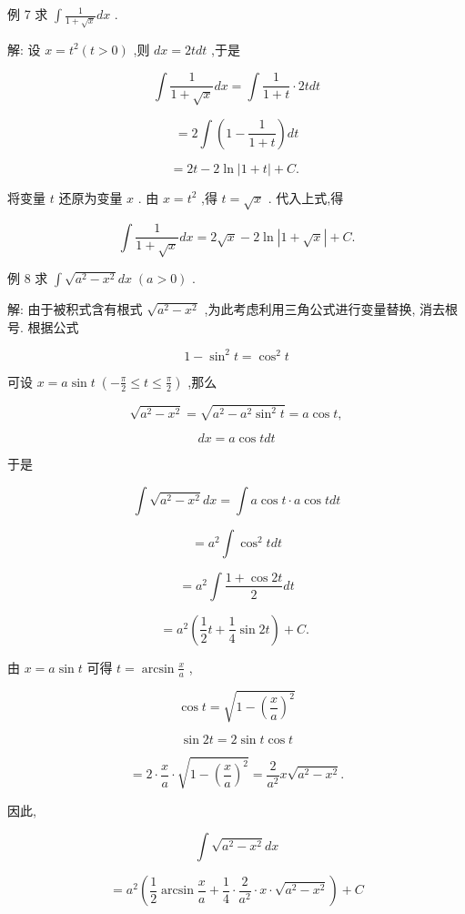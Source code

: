 \documentclass[lang=cn,newtx,10pt,scheme=chinese]{elegantbook}
\begin{document}
例 7 求 \(\int \frac{1}{1 + \sqrt{x}}{dx}\) .

解: 设 \(x = {t}^{2}\left( {t > 0}\right)\) ,则 \({dx} = {2tdt}\) ,于是

\[
\int \frac{1}{1 + \sqrt{x}}{dx} = \int \frac{1}{1 + t} \cdot {2tdt}
\]

\[
= 2\int \left( {1 - \frac{1}{1 + t}}\right) {dt}
\]

\[
= {2t} - 2\ln \left| {1 + t}\right| + C\text{. }
\]

将变量 \(t\) 还原为变量 \(x\) . 由 \(x = {t}^{2}\) ,得 \(t = \sqrt{x}\) . 代入上式,得

\[
\int \frac{1}{1 + \sqrt{x}}{dx} = 2\sqrt{x} - 2\ln \left| {1 + \sqrt{x}}\right| + C.
\]

例 8 求 \(\int \sqrt{{a}^{2} - {x}^{2}}{dx}\;\left( {a > 0}\right)\) .

解: 由于被积式含有根式 \(\sqrt{{a}^{2} - {x}^{2}}\) ,为此考虑利用三角公式进行变量替换, 消去根号. 根据公式

\[
1 - {\sin }^{2}t = {\cos }^{2}t
\]

可设 \(x = a\sin t\;\left( {-\frac{\pi }{2} \leq t \leq \frac{\pi }{2}}\right)\) ,那么

\[
\sqrt{{a}^{2} - {x}^{2}} = \sqrt{{a}^{2} - {a}^{2}{\sin }^{2}t} = a\cos t,
\]

\[
{dx} = a\cos {tdt}
\]

于是

\[
\int \sqrt{{a}^{2} - {x}^{2}}{dx} = \int a\cos t \cdot a\cos {tdt}
\]

\[
= {a}^{2}\int {\cos }^{2}{tdt}
\]

\[
= {a}^{2}\int \frac{1 + \cos {2t}}{2}{dt}
\]

\[
= {a}^{2}\left( {\frac{1}{2}t + \frac{1}{4}\sin {2t}}\right) + C\text{. }
\]

由 \(x = a\sin t\) 可得 \(t = \arcsin \frac{x}{a}\) ,

\[
\cos t = \sqrt{1 - {\left( \frac{x}{a}\right) }^{2}}
\]

\[
\sin {2t} = 2\sin t\cos t
\]

\[
= 2 \cdot \frac{x}{a} \cdot \sqrt{1 - {\left( \frac{x}{a}\right) }^{2}} = \frac{2}{{a}^{2}}x\sqrt{{a}^{2} - {x}^{2}}.
\]

因此,

\[
\int \sqrt{{a}^{2} - {x}^{2}}{dx}
\]

\[
= {a}^{2}\left( {\frac{1}{2}\arcsin \frac{x}{a} + \frac{1}{4} \cdot \frac{2}{{a}^{2}} \cdot x \cdot \sqrt{{a}^{2} - {x}^{2}}}\right) + C
\]
\end{document}
